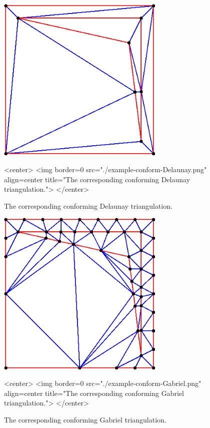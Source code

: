 \begin{figure}[htbp]
\begin{ccTexOnly}
\begin{center}
\includegraphics[width=8cm]{Mesh_2/example-conform-Delaunay}
\end{center}
\end{ccTexOnly}
\caption{The corresponding conforming Delaunay triangulation.}
\label{Conform-example-conform-Delaunay}

\begin{ccHtmlOnly}
<center>
<img border=0 src="./example-conform-Delaunay.png"
     align=center title="The corresponding conforming Delaunay triangulation.">
</center>
\end{ccHtmlOnly}
\end{figure}

\begin{figure}[htbp]
\begin{ccTexOnly}
\begin{center}
\includegraphics[width=8cm]{Mesh_2/example-conform-Gabriel}
\end{center}
\end{ccTexOnly}
\caption{The corresponding conforming Gabriel triangulation.}
\label{Conform-example-conform-Gabriel}

\begin{ccHtmlOnly}
<center>
<img border=0 src="./example-conform-Gabriel.png"
     align=center title="The corresponding conforming Gabriel triangulation.">
</center>
\end{ccHtmlOnly}
\end{figure}

